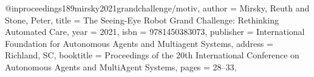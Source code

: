 @inproceedings{189mirsky2021grandchallenge/motiv,
author = {Mirsky, Reuth and Stone, Peter},
title = {The Seeing-Eye Robot Grand Challenge: Rethinking Automated Care},
year = {2021},
isbn = {9781450383073},
publisher = {International Foundation for Autonomous Agents and Multiagent Systems},
address = {Richland, SC},
booktitle = {Proceedings of the 20th International Conference on Autonomous Agents and MultiAgent Systems},
pages = {28–33},
}